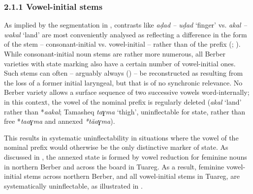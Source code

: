 \documentclass[output=paper]{langscibook}
\begin{document}
\subsubsection{2.1.1 Vowel-initial stems}
\begin{styleStandarduser}
As implied by the segmentation in , contrasts like \textit{aḍad – uḍad} ‘finger’ vs. \textit{akal – wakal} ‘land’ are most conveniently analysed as reflecting a difference in the form of the stem – consonant-initial vs. vowel-initial – rather than of the prefix (\citealt{Prasse1964}; \citealt{Penchoen1973}). While consonant-initial noun stems are rather more numerous, all Berber varieties with state marking also have a certain number of vowel-initial ones. Such stems can often – arguably always (\citealt{Prasse1969,Prasse2011}) – be reconstructed as resulting from the loss of a former initial laryngeal, but that is of no synchronic relevance. No Berber variety allows a surface sequence of two successive vowels word-internally; in this context, the vowel of the nominal prefix is regularly deleted (\textit{akal} ‘land’ rather than *\textit{aakal}; Tamasheq \textit{taɣma} ‘thigh’, uninflectable for state, rather than free *\textit{taaɣma} and annexed \textit{*tăaɣma}).
\end{styleStandarduser}

\begin{styleStandarduser}
This results in systematic uninflectability in situations where the vowel of the nominal prefix would otherwise be the only distinctive marker of state. As discussed in , the annexed state is formed by vowel reduction for feminine nouns in northern Berber and across the board in Tuareg. As a result, feminine vowel-initial stems across northern Berber, and all vowel-initial stems in Tuareg, are systematically uninflectable, as illustrated in .
\end{styleStandarduser}

\begin{styleLangsciTableHeading}%
\begin{table}
\caption{Vowel-initial stems contrasted across Kabyle and Tamasheq}
\label{tab:key:3}
\end{table}\end{styleLangsciTableHeading}
\end{document}
